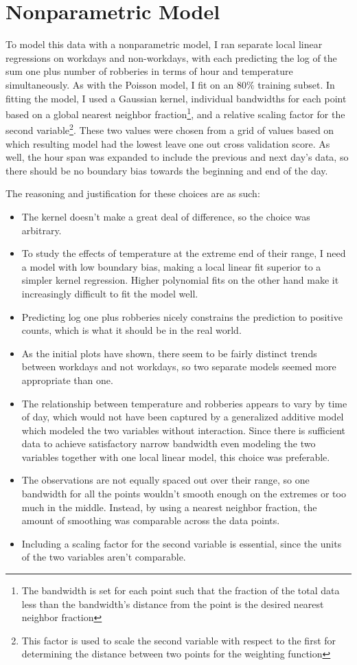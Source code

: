 \documentclass[11pt]{article}
\theoremstyle{definition}
\begin{document}
\section{Nonparametric Model} 
To model this data with a nonparametric model, I ran separate local linear regressions on workdays and non-workdays, with each predicting the log of the sum one plus number of robberies in terms of hour and temperature simultaneously. As with the Poisson model, I fit on an $80\%$ training subset. In fitting the model, I used a Gaussian kernel, individual bandwidths for each point based on a global nearest neighbor fraction\footnote{The bandwidth is set for each point such that the fraction of the total data less than the bandwidth's distance from the point is the desired nearest neighbor fraction}, and a relative scaling factor for the second variable\footnote{This factor is used to scale the second variable with respect to the first for determining the distance between two points for the weighting function}. These two values were chosen from a grid of values based on which resulting model had the lowest leave one out cross validation score. As well, the hour span was expanded to include the previous and next day's data, so there should be no boundary bias towards the beginning and end of the day.\par
The reasoning and justification for these choices are as such:
\begin{itemize}
    \item The kernel doesn't make a great deal of difference, so the choice was arbitrary. 
    \item To study the effects of temperature at the extreme end of their range, I need a model with low boundary bias, making a local linear fit superior to a simpler kernel regression. Higher polynomial fits on the other hand make it increasingly difficult to fit the model well.
    \item Predicting log one plus robberies nicely constrains the prediction to positive counts, which is what it should be in the real world.
    \item As the initial plots have shown, there seem to be fairly distinct trends between workdays and not workdays, so two separate models seemed more appropriate than one. 
    \item The relationship between temperature and robberies appears to vary by time of day, which would not have been captured by a generalized additive model which modeled the two variables without interaction. Since there is sufficient data to achieve satisfactory narrow bandwidth even modeling the two variables together with one local linear model, this choice was preferable.
    \item The observations are not equally spaced out over their range, so one bandwidth for all the points wouldn't smooth enough on the extremes or too much in the middle. Instead, by using a nearest neighbor fraction, the amount of smoothing was comparable across the data points.
    \item Including a scaling factor for the second variable is essential, since the units of the two variables aren't comparable.
\end{itemize} \par
\end{document}
